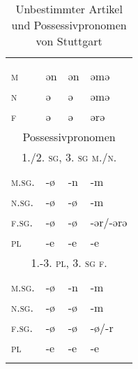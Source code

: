 \begin{table}[H]
	\caption{Unbestimmter Artikel und Possessivpronomen von Stuttgart \citep[156]{Frey1975}}\label{table114}
	\begin{tabular}{llll}
		\lsptoprule
		\multicolumn{4}{l}{unbestimmter Artikel}\\
		& \NOM & \AKK & \DAT\\\midrule
		 \textsc{m} & ǝn & ǝn & ǝmǝ\\
		 \textsc{n} & ǝ & ǝ & ǝmǝ\\
		 \textsc{f} & ǝ & ǝ & ǝrǝ\\ \midrule
		\multicolumn{4}{c}{Possessivpronomen}\\		
		\multicolumn{4}{c}{\scshape 1./2. \textsc{sg}, 3. \textsc{sg} m./n.} \\\cmidrule(lr){1-4}
		& \NOM & \AKK & \DAT\\\midrule
		\textsc{m.sg.} & {}-ø & {}-n & {}-m\\
		\textsc{n.sg.} & {}-ø & {}-ø & {}-m\\
		\textsc{f.sg.} & {}-ø & {}-ø & {}-ǝr/-ǝrǝ\\
		\textsc{pl} & {}-e & {}-e & {}-e\\ \midrule
		\multicolumn{4}{c}{\scshape 1.-3. \textsc{pl}, 3. \textsc{sg} f.}  \\\cmidrule(lr){1-4}
		& \NOM & \AKK & \DAT\\\midrule
		\textsc{m.sg.} & {}-ø & {}-n & {}-m\\
		\textsc{n.sg.} & {}-ø & {}-ø & {}-m\\
		\textsc{f.sg.} & {}-ø & {}-ø & {}-ø/-r\\
		\textsc{pl} & {}-e & {}-e & {}-e\\
		\lspbottomrule
	\end{tabular}

\end{table}


